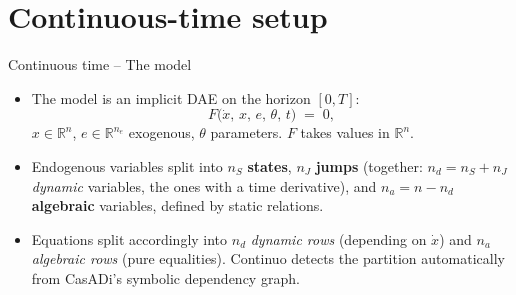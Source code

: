 \documentclass[11pt,aspectratio=169]{beamer}
\begin{document}
\section{Continuous-time setup}

\begin{frame}{Continuous time -- The model}

\begin{itemize}

\item The model is an implicit DAE on the horizon $[0,T]$:
  \[
  \boxed{F\bigl(\dot x,\, x,\, e,\, \theta,\, t\bigr) \;=\; 0,}
  \]
  $x\in\mathbb R^n$, $e\in\mathbb R^{n_e}$ exogenous,
  $\theta$ parameters. $F$ takes values in $\mathbb R^n$.\newline

\item Endogenous variables split into $n_S$ \textbf{states}, $n_J$ \textbf{jumps} (together: $n_d = n_S+n_J$
    \emph{dynamic} variables, the ones with a time derivative), and $n_a = n - n_d$ \textbf{algebraic} variables, defined by static
    relations.\newline

\item Equations split accordingly into $n_d$ \emph{dynamic rows}
  (depending on $\dot x$) and $n_a$ \emph{algebraic rows}
  (pure equalities). Continuo detects the partition
  automatically from CasADi's symbolic dependency graph.

\end{itemize}

\end{frame}
\end{document}
